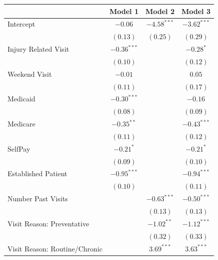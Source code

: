 \documentclass[12pt,twoside]{reedthesis}
\begin{document}
  \begin{table}
  \begin{center}
  \begin{small}
  \begin{tabular}{l c c c }
  \hline
   & Model 1 & Model 2 & Model 3 \\
  \hline
  Intercept                     & $-0.06$       & $-4.58^{***}$ & $-3.62^{***}$ \\
                                & $(0.13)$      & $(0.25)$      & $(0.29)$      \\
  Injury Related Visit          & $-0.36^{***}$ &               & $-0.28^{*}$   \\
                                & $(0.10)$      &               & $(0.12)$      \\
  Weekend Visit                 & $-0.01$       &               & $0.05$        \\
                                & $(0.11)$      &               & $(0.17)$      \\
  Medicaid                      & $-0.30^{***}$ &               & $-0.16$       \\
                                & $(0.08)$      &               & $(0.09)$      \\
  Medicare                      & $-0.35^{**}$  &               & $-0.43^{***}$ \\
                                & $(0.11)$      &               & $(0.12)$      \\
  SelfPay                       & $-0.21^{*}$   &               & $-0.21^{*}$   \\
                                & $(0.09)$      &               & $(0.10)$      \\
  Established Patient           & $-0.95^{***}$ &               & $-0.94^{***}$ \\
                                & $(0.10)$      &               & $(0.11)$      \\
  Number Past Visits            &               & $-0.63^{***}$ & $-0.50^{***}$ \\
                                &               & $(0.13)$      & $(0.13)$      \\
  Visit Reason: Preventative    &               & $-1.02^{**}$  & $-1.12^{***}$ \\
                                &               & $(0.32)$      & $(0.33)$      \\
  Visit Reason: Routine/Chronic &               & $3.69^{***}$  & $3.63^{***}$  \\

\end{tabular}
\end{small}
\end{center}
\end{table}
\end{document}
